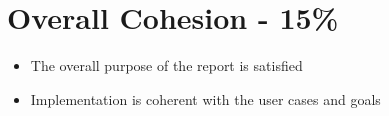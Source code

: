 \documentclass[]{article}
\begin{document}
\section{Overall Cohesion - 15\%}
 \begin{itemize}
   \item The overall purpose of the report is satisfied
   \item Implementation is coherent with the user cases and goals
 \end{itemize}
\end{document}
